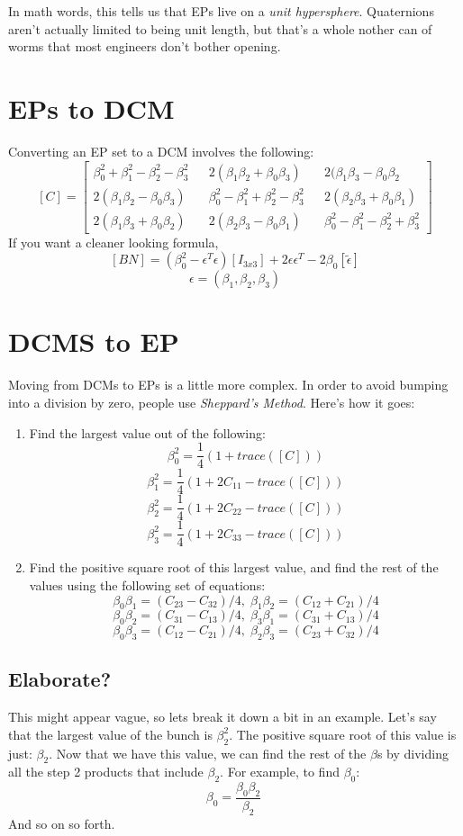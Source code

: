 \documentclass[a4paper,14pt]{extreport}
\begin{document}
In math words, this tells us that EPs live on a \emph{unit hypersphere}. Quaternions aren't actually limited to being unit length, but that's a whole nother can of worms that most engineers don't bother opening.
\section{EPs to DCM}
Converting an EP set to a DCM involves the following:
\[
[C] = 
\begin{bmatrix}
\beta_0^2+\beta_1^2-\beta_2^2-\beta_3^2&&2(\beta_1\beta_2+\beta_0\beta_3)&&2(\beta_1\beta_3-\beta_0\beta_2\\
2(\beta_1\beta_2-\beta_0\beta_3)&&\beta_0^2-\beta_1^2+\beta_2^2-\beta_3^2&&2(\beta_2\beta_3+\beta_0\beta_1)\\2(\beta_1\beta_3+\beta_0\beta_2)&&2(\beta_2\beta_3-\beta_0\beta_1)&&\beta_0^2-\beta_1^2-\beta_2^2+\beta_3^2
\end{bmatrix}
\]
If you want a cleaner looking formula,
\[
[BN] = (\beta_0^2 - \epsilon^T\epsilon)[I_{3x3}]+2\epsilon\epsilon^T-2\beta_0[\tilde{\epsilon}]
\]
\[
\epsilon = (\beta_1,\beta_2,\beta_3)
\]
\section{DCMS to EP}
Moving from DCMs to EPs is a little more complex. In order to avoid bumping into a division by zero, people use \emph{Sheppard's Method}. Here's how it goes:
\begin{enumerate}
\item{Find the largest value out of the following:\\
\[
\beta_0^2 = \dfrac{1}{4}(1+trace([C]))
\]
\[
\beta_1^2 = \dfrac{1}{4}(1+2C_{11}-trace([C]))
\]
\[
\beta_2^2 = \dfrac{1}{4}(1+2C_{22}-trace([C]))
\]
\[
\beta_3^2 = \dfrac{1}{4}(1+2C_{33}-trace([C]))
\]}
\item{Find the positive square root of this largest value, and find the rest of the values using the following set of equations:\\
\[\beta_0\beta_1=(C_{23}-C_{32})/4,\;\beta_1\beta_2=(C_{12}+C_{21})/4\]
\[\beta_0\beta_2=(C_{31}-C_{13})/4,\;\beta_3\beta_1=(C_{31}+C_{13})/4\]
\[\beta_0\beta_3=(C_{12}-C_{21})/4,\;\beta_2\beta_3=(C_{23}+C_{32})/4\]
}
\end{enumerate}

\subsection{Elaborate?}
This might appear vague, so lets break it down a bit in an example. Let's say that the largest value of the bunch is 
\(\beta_2^2\). The positive square root of this value is just: \(\beta_2\). Now that we have this value, we can find the rest of the $\beta$s by dividing all the step 2 products that include $\beta_2$. For example, to find $\beta_0$:
\[
\beta_0=\dfrac{\beta_0\beta_2}{\beta_2}\
\]
And so on so forth.
\end{document}
